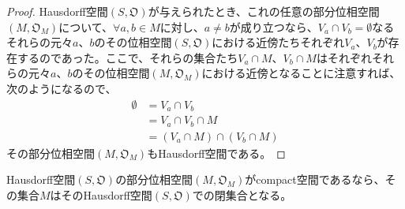 \documentclass[dvipdfmx]{jsarticle}
\begin{document}
\begin{proof}
Hausdorff空間$\left( S,\mathfrak{O} \right)$が与えられたとき、これの任意の部分位相空間$\left( M,\mathfrak{O}_{M} \right)$について、$\forall a,b \in M$に対し、$a \neq b$が成り立つなら、$V_{a} \cap V_{b} = \emptyset$なるそれらの元々$a$、$b$のその位相空間$\left( S,\mathfrak{O} \right)$における近傍たちそれぞれ$V_{a}$、$V_{b}$が存在するのであった。ここで、それらの集合たち$V_{a} \cap M$、$V_{b} \cap M$はそれぞれそれらの元々$a$、$b$のその位相空間$\left( M,\mathfrak{O}_{M} \right)$における近傍となることに注意すれば、次のようになるので、
\begin{align*}
\emptyset &= V_{a} \cap V_{b}\\
&= V_{a} \cap V_{b} \cap M\\
&= \left( V_{a} \cap M \right) \cap \left( V_{b} \cap M \right)
\end{align*}
その部分位相空間$\left( M,\mathfrak{O}_{M} \right)$もHausdorff空間である。
\end{proof}
\begin{thm}\label{8.1.6.10}
Hausdorff空間$\left( S,\mathfrak{O} \right)$の部分位相空間$\left( M,\mathfrak{O}_{M} \right)$がcompact空間であるなら、その集合$M$はそのHausdorff空間$\left( S,\mathfrak{O} \right)$での閉集合となる。
\end{thm}
\end{document}
